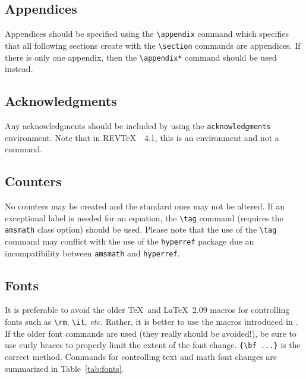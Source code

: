 \documentclass[twocolumn,secnumarabic,amssymb, nobibnotes, aps, prd]{revtex4-1}
\newcommand{\revtex}{REV\TeX\ }
\newcommand{\classoption}[1]{\texttt{#1}}
\newcommand{\macro}[1]{\texttt{\textbackslash#1}}
\newcommand{\m}[1]{\macro{#1}}
\newcommand{\env}[1]{\texttt{#1}}
\begin{document}
\subsection{Appendices}
Appendices should be specified using the \m{appendix} command which
specifies that all following sections create with the \m{section}
commands are appendices. If there is only one appendix, then the
\m{appendix*} command should be used instead.

\subsection{Acknowledgments}
Any acknowledgments should be included by using the
\env{acknowledgments} environment. Note that in \revtex~4.1, this is
an environment and not a command.

\subsection{Counters}
No counters may be created and the standard ones may not be
altered. If an exceptional label is needed for an equation, the \m{tag}
command (requires the \classoption{amsmath} class option) should be used. Please
note that the use of the \m{tag} command may conflict with the use of the \classoption{hyperref} package
due an incompatibility between \classoption{amsmath} and \classoption{hyperref}.

\subsection{Fonts}
It is preferable to avoid the older \TeX\ and \LaTeX\ 2.09 macros for
controlling fonts such as \m{rm}, \m{it}, \textit{etc.} Rather, it is
better to use the macros introduced in \LaTeXe.  If the older font
commands are used (they really should be avoided!), be sure to use
curly braces to properly limit the extent of the font
change. \verb+{\bf ...}+ is the correct method.
Commands for controlling text and math font changes are summarized in
Table~\ref{tab:fonts}.
\end{document}
